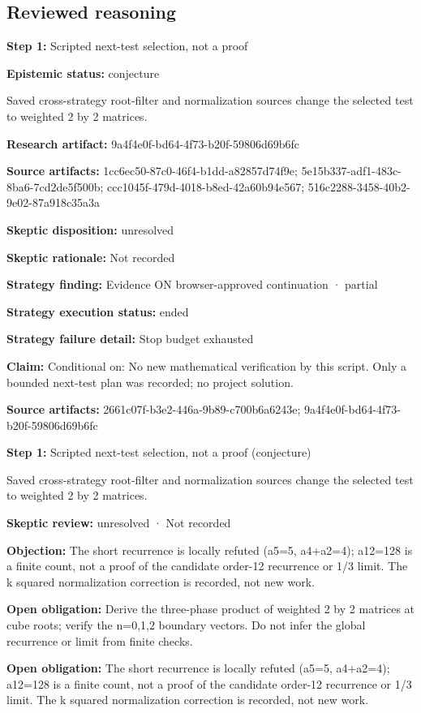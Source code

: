 \documentclass[11pt]{article}
\begin{document}
\subsection{Reviewed reasoning}
\textbf{Step 1:} Scripted next-test selection, not a proof\par
\textbf{Epistemic status:} conjecture\par
Saved cross-strategy root-filter and normalization sources change the selected test to weighted 2 by 2 matrices.\par
\textbf{Research artifact:} 9a4f4e0f-bd64-4f73-b20f-59806d69b6fc\par
\textbf{Source artifacts:} 1cc6ec50-87c0-46f4-b1dd-a82857d74f9e; 5e15b337-adf1-483c-8ba6-7cd2de5f500b; ccc1045f-479d-4018-b8ed-42a60b94e567; 516c2288-3458-40b2-9e02-87a918c35a3a\par
\textbf{Skeptic disposition:} unresolved\par
\textbf{Skeptic rationale:} Not recorded\par
\textbf{Strategy finding:} Evidence ON browser-approved continuation · partial\par
\textbf{Strategy execution status:} ended\par
\textbf{Strategy failure detail:} Stop budget exhausted\par
\textbf{Claim:} Conditional on: No new mathematical verification by this script. Only a bounded next-test plan was recorded; no project solution.\par
\textbf{Source artifacts:} 2661c07f-b3e2-446a-9b89-c700b6a6243e; 9a4f4e0f-bd64-4f73-b20f-59806d69b6fc\par
\textbf{Step 1:} Scripted next-test selection, not a proof (conjecture)\par
Saved cross-strategy root-filter and normalization sources change the selected test to weighted 2 by 2 matrices.\par
\textbf{Skeptic review:} unresolved · Not recorded\par
\textbf{Objection:} The short recurrence is locally refuted (a5=5, a4+a2=4); a12=128 is a finite count, not a proof of the candidate order-12 recurrence or 1/3 limit. The k squared normalization correction is recorded, not new work.\par
\textbf{Open obligation:} Derive the three-phase product of weighted 2 by 2 matrices at cube roots; verify the n=0,1,2 boundary vectors. Do not infer the global recurrence or limit from finite checks.\par
\textbf{Open obligation:} The short recurrence is locally refuted (a5=5, a4+a2=4); a12=128 is a finite count, not a proof of the candidate order-12 recurrence or 1/3 limit. The k squared normalization correction is recorded, not new work.\par
\end{document}
